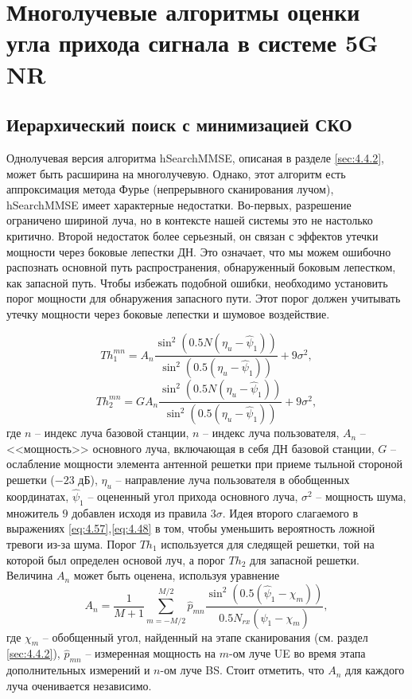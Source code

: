 \section{Многолучевые алгоритмы оценки угла прихода сигнала в системе 5G NR}
\subsection{Иерархический поиск с минимизацией СКО}
\label{sec:hSearchMMSE:multipath}

Однолучевая версия алгоритма hSearchMMSE, описаная в разделе \ref{sec:4.4.2},
может быть расширина на многолучевую.  Однако, этот алгоритм есть аппроксимация
метода Фурье (непрерывного сканирования лучом), hSearchMMSE имеет характерные
недостатки.
Во-первых, разрешение ограничено шириной луча, но в контексте нашей
системы это не настолько критично. Второй недостаток более серьезный, он связан
с эффектов утечки мощности через боковые лепестки ДН.  Это означает, что мы
можем ошибочно распознать основной путь распространения, обнаруженный боковым
лепестком, как запасной путь.  Чтобы избежать подобной ошибки, необходимо
установить порог мощности для обнаружения запасного пути. Этот порог должен
учитывать утечку мощности через боковые лепестки и шумовое воздействие.

\begin{equation}
    \label{eq:4.57}
    Th_1^{mn} = A_n
    \frac
    {\sin^2(0.5 N (\eta_u - \hat \psi_1))}
    {\sin^2(0.5 (\eta_u - \hat \psi_1))} + 9 \sigma^2,
\end{equation}
\begin{equation}
    \label{eq:4.58}
    Th_2^{mn} = G A_n \frac{\sin^2(0.5 N (\eta_u - \hat \psi_1))}
    {\sin^2(0.5 (\eta_u - \hat \psi_1))} + 9 \sigma^2,
\end{equation}
где $n$ -- индекс луча базовой станции, $n$ -- индекс луча пользователя, $A_n$
-- <<мощность>> основного луча, включающая в себя ДН базовой станции, $G$ --
ослабление мощности элемента антенной решетки при приеме тыльной стороной
решетки ($-23$ дБ), $\eta_u$ -- направление луча пользователя в обобщенных
координатах, $\hat \psi_1$ -- оцененный угол прихода основного луча, $\sigma^2$
-- мощность шума, множитель $9$ добавлен исходя из правила $3\sigma$.
Идея второго слагаемого в выражениях \eqref{eq:4.57},\eqref{eq:4.48} в том,
чтобы уменьшить вероятность ложной тревоги из-за шума.
Порог $Th_1$ используется
для следящей решетки, той на которой был определен основой луч, а порог $Th_2$
для запасной решетки.  Величина $A_n$ может быть оценена, используя уравнение
\begin{equation}
    A_n = \frac{1}{M+1} \sum\limits_{m=-M/2}^{M/2} \hat p_{mn}
    \frac{\sin^2(0.5(\hat \psi_1 - \chi_m))}{0.5 N_{rx}(\hat \psi_1 - \chi_m)},
\end{equation}
где $\chi_m$ -- обобщенный угол, найденный на этапе сканирования
(см. раздел \eqref{sec:4.4.2}), $\hat p_{mn}$ --
измеренная мощность на $m$-ом луче UE во время этапа дополнительных измерений и
$n$-ом луче BS.
Стоит отметить, что $A_n$ для каждого луча оченивается независимо.

